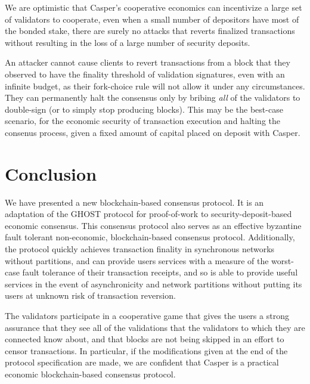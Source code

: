 \documentclass[11pt,a4paper]{article}
\begin{document}
We are optimistic that Casper's cooperative economics can incentivize a large set of validators to cooperate, even when a small number of depositors have most of the bonded stake, there are surely no attacks that reverts finalized transactions without resulting in the loss of a large number of security deposits.

An attacker cannot cause clients to revert transactions from a block that they observed to have the finality threshold of validation signatures, even with an infinite budget, as their fork-choice rule will not allow it under any circumstances. They can permanently halt the consensus only by bribing \emph{all} of the validators to double-sign (or to simply stop producing blocks). This may be the best-case scenario, for the economic security of transaction execution and halting the consenus process, given a fixed amount of capital placed on deposit with Casper.


\section{Conclusion}

We have presented a new blockchain-based consensus protocol. It is an adaptation of the GHOST protocol for proof-of-work to security-deposit-based economic consensus. This consensus protocol also serves as an effective byzantine fault tolerant non-economic, blockchain-based consensus protocol. Additionally, the protocol quickly achieves transaction finality in synchronous networks without partitions, and can provide users services with a measure of the worst-case fault tolerance of their transaction receipts, and so is able to provide useful services in the event of asynchronicity and network partitions without putting its users at unknown risk of transaction reversion. 

The validators participate in a cooperative game that gives the users a strong assurance that they see all of the validations that the validators to which they are connected know about, and that blocks are not being skipped in an effort to censor transactions. In particular, if the modifications given at the end of the protocol specification are made, we are confident that Casper is a practical economic blockchain-based consensus protocol.



\end{document}
